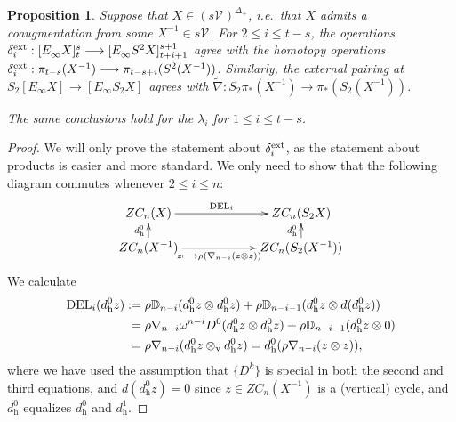 \documentclass[11pt]{amsart} \renewcommand{\baselinestretch}{1.2}
\theoremstyle{plain}
\newtheorem{prop}[thm]{Proposition}
\theoremstyle{definition}
\renewcommand{\to}{\longrightarrow}
\newcommand{\calV}{\mathcal{V}}
\newcommand{\vect}[2]{\calV^{#1}_{#2}}
\newcommand{\twist}{\omega}
\newcommand{\E}[5]{[E^{#1}_{#2}#3]^{#4}_{#5}}
\newcommand{\dver}{_\mathrm{v}}
\newcommand{\dhor}{_\mathrm{h}}
\renewcommand{\mapsto}{\longmapsto}
\begin{document}
\begin{second quadrant homotopy sseq operations}
\begin{prop}
\label{Prop on einfty ops}
Suppose that $X\in (s\vect{}{})^{\Delta_+}$, i.e.\ that $X$ admits a coaugmentation from some $X^{-1}\in s\vect{}{}$. For $2\leq i\leq t-s$, the operations $\delta^\textup{ext}_i:\E{}{\infty}{X}{s}{t}\to \E{}{\infty}{S^2X}{s+1}{t+i+1}$ agree with the homotopy operations $\delta^\textup{ext}_i:\pi_{t-s}(X^{-1})\to \pi_{t-s+i}(S^2(X^{-1}))$. Similarly, the external pairing at $S_2\E{}{\infty}{X}{}{}\to \E{}{\infty}{S_2X}{}{}$ agrees with  $\widetilde{\nabla}:S_2\pi_*(X^{-1})\to \pi_*(S_2(X^{-1}))$.

The same conclusions hold for the $\lambda_i$ for $1\leq i\leq t-s$.
\end{prop}
\begin{proof}
We will only prove the statement about $\delta_i^\textup{ext}$, as the statement about products is easier and more standard. We only need to show that the following diagram commutes whenever $2\leq i\leq n$:
\[\xymatrix@R=4mm@C=21mm{
ZC_{n}(X)
\ar[r]^-{\textup{DEL}_i}
\ar[d];[]^-{d\dhor^0}
&%
ZC_{n}(S_2X)\ar[d];[]^-{d\dhor^0}
\\%
ZC_{n}(X^{-1})
\ar[r]_-{z\mapsto \rho(\nabla_{n-i}(z\otimes z))}
&%
ZC_{n}(S_2(X^{-1}))
}\]
We calculate
\begin{alignat*}{3}
\textup{DEL}_i(d\dhor^{0}z)
:={}&
\rho\mathbb{D}_{n-i}(d\dhor^{0}z\otimes d\dhor^{0}z)+\rho\mathbb{D}_{n-i-1}(d\dhor^{0}z\otimes d(d\dhor^{0}z))%
\\
={}&
\rho\nabla_{n-i}\twist^{n-i}D^0(d\dhor^{0}z\otimes d\dhor^{0}z)+\rho\mathbb{D}_{n-i-1}(d\dhor^{0}z\otimes 0)\\
={}&
\rho\nabla_{n-i}(d\dhor^{0}z\otimes\dver d\dhor^{0}z)=d\dhor^{0}(\rho\nabla_{n-i}(z\otimes z)),
\end{alignat*}
where we have used the assumption that $\{D^k\}$ is special in both the second and third equations, and $d(d\dhor^{0}z)=0$ since $z\in ZC_n(X^{-1})$ is a (vertical) cycle, and $d\dhor^{0}$ equalizes $d\dhor^{0}$ and $d\dhor^{1}$.
\end{proof}



\end{second quadrant homotopy sseq operations}
\end{document}
